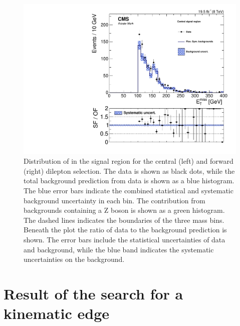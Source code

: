 \begin{figure}[htbp]
\begin{minipage}[t]{0.49\textwidth}
\end{minipage}
\begin{minipage}[t]{0.49\textwidth}
\includegraphics[width=\textwidth]{plots/results/rSFOFDependencies/rSFOFDependency_SignalCentral_MET_Full2012_SF_lowMass.pdf}
\end{minipage}
\caption{Distribution of \mll in the signal region for the central (left) and forward (right) dilepton selection. The data is shown as black dots, while the total background prediction from data is shown as a blue histogram. The blue error bars indicate the combined statistical and systematic background uncertainty in each bin. The contribution from backgrounds containing a Z boson is shown as a green histogram. The dashed lines indicates the boundaries of the three mass bins. Beneath the plot the ratio of data to the background prediction is shown. The error bars include the statistical uncertainties of data and background, while the blue band indicates the systematic uncertainties on the background. }
\label{fig:timeDependece}
\end{figure}


\section{Result of the search for a kinematic edge}